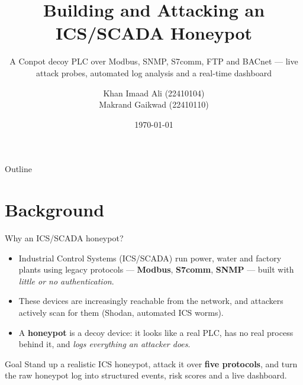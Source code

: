 \documentclass[aspectratio=169,11pt]{beamer}
\title[Conpot ICS Honeypot]{Building and Attacking an ICS/SCADA Honeypot}
\subtitle{A Conpot decoy PLC over Modbus, SNMP, S7comm, FTP and BACnet --- live attack probes, automated log analysis and a real-time dashboard}
\author{Khan Imaad Ali \textnormal{(22410104)}\\[3pt] Makrand Gaikwad \textnormal{(22410110)}}
\institute{[Course / Module --- University]}
\date{\today}
\begin{document}
\begin{frame}[plain]
  \titlepage
\end{frame}

\begin{frame}{Outline}
  \tableofcontents
\end{frame}

\section{Background}
\begin{frame}{Why an ICS/SCADA honeypot?}
  \begin{itemize}
    \item Industrial Control Systems (ICS/SCADA) run power, water and factory plants
          using legacy protocols --- \textbf{Modbus}, \textbf{S7comm}, \textbf{SNMP} ---
          built with \emph{little or no authentication}.
    \item These devices are increasingly reachable from the network, and attackers
          actively scan for them (Shodan, automated ICS worms).
    \item A \textbf{honeypot} is a decoy device: it looks like a real PLC, has no real
          process behind it, and \emph{logs everything an attacker does}.
  \end{itemize}
  \vfill
  \begin{block}{Goal}
    Stand up a realistic ICS honeypot, attack it over \textbf{five protocols}, and turn the
    raw honeypot log into structured events, risk scores and a live dashboard.
  \end{block}
\end{frame}
\end{document}
